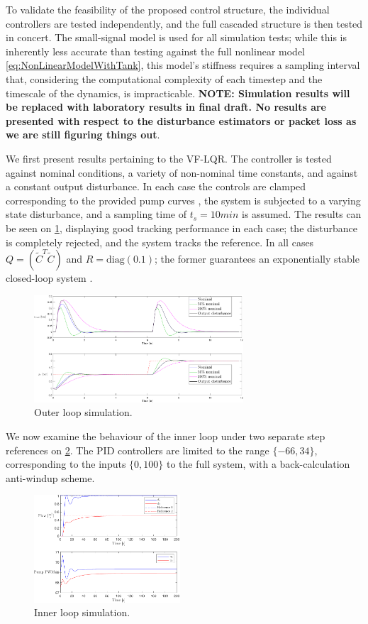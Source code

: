 To validate the feasibility of the proposed control structure, the individual controllers are tested independently, and the full cascaded structure is then tested in concert. The small-signal model is used for all simulation tests; while this is inherently less accurate than testing against the full nonlinear model \cref{eq:NonLinearModelWithTank}, this model's stiffness requires a sampling interval that, considering the computational complexity of each timestep and the timescale of the dynamics, is impracticable. \textbf{NOTE: Simulation results will be replaced with laboratory results in final draft. No results are presented with respect to the disturbance estimators or packet loss as we are still figuring things out}.

We first present results pertaining to the VF-LQR. The controller is tested against nominal conditions, a variety of non-nominal time constants, and against a constant output disturbance. In each case the controls are clamped corresponding to the provided pump curves \cite{GrundfosDatablad}, the system is subjected to a varying state disturbance, and a sampling time of $t_s = 10\si{min}$ is assumed. The results can be seen on \cref{fig:LQRTracking}, displaying good tracking performance in each case; the disturbance is completely rejected, and the system tracks the reference. In all cases $Q = \left(\tilde{C}^T\tilde{C}\right)$ and $R = \text{diag}(0.1)$; the former guarantees an exponentially stable closed-loop system \cite{Liberzon2012}.


\begin{figure}[h!]
	\includegraphics[height=4cm, width=\linewidth]{Graphics/LQRTracking.pdf}
	\caption{Outer loop simulation.}
	\label{fig:LQRTracking}
\end{figure}

 We now examine the behaviour of the inner loop under two separate step references on \cref{fig:PumpSimulation}. The PID controllers are limited to the range $\{-66,34\}$, corresponding to the inputs $\{0,100\}$ to the full system, with a back-calculation anti-windup scheme.

\begin{figure}[h!]
	\includegraphics[width=\linewidth,height=4cm]{Graphics/PumpSimulation.pdf}
	\caption{Inner loop simulation.}
	\label{fig:PumpSimulation}
\end{figure}

